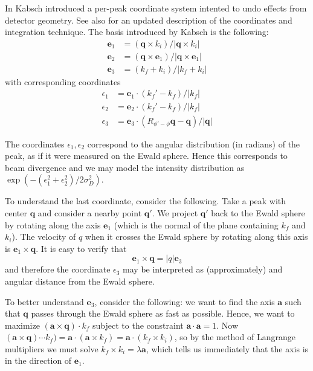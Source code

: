 \documentclass[twocolumn,preprintnumbers,amsmath,amssymb]{revtex4}
\newcommand{\ba}{\mathbf{a}}
\newcommand{\be}{\mathbf{e}}
\newcommand{\bq}{\mathbf{q}}
\begin{document}
In \cite{kabsch-1988} Kabsch introduced a per-peak coordinate system intented to undo effects from detector geometry.
See also \cite{kabsch-2010} for an updated description of the coordinates and integration technique.
The basis introduced by Kabsch is the following:
\begin{align}
  \be_1 &= (\bq \times k_i) / |\bq \times k_i| \\
  \be_2 &= (\bq \times \be_1) / |\bq \times \be_1| \\
  \be_3 &= (k_f + k_i) / |k_f + k_i|
\end{align}
with corresponding coordinates
\begin{align}
  \epsilon_1 &= \be_1 \cdot (k_f'-k_f) / |k_f| \\
  \epsilon_2 &= \be_2 \cdot (k_f'-k_f) / |k_f| \\
  \epsilon_3 &= \be_3 \cdot (R_{\phi'-\phi}\bq-\bq) / |\bq|
\end{align}

The coordinates $\epsilon_1, \epsilon_2$ correspond to the angular distribution (in radians) of the peak, as if it were measured on the Ewald sphere. Hence this corresponds to beam divergence and we may model the intensity distribution as $\exp(-(\epsilon_1^2 + \epsilon_2^2)/2 \sigma_D^2)$.

To understand the last coordinate, consider the following. Take a peak with center $\bq$ and consider a nearby point $\bq'$. We project $\bq'$ back to the Ewald sphere by rotating along the axis $\be_1$ (which is the normal of the plane containing $k_f$ and $k_i$). The velocity of $q$ when it crosses the Ewald sphere by rotating along this axis is $\be_1 \times \bq$. It is easy to verify that
\begin{equation} \be_1 \times \bq = |q| \be_3 \end{equation}
and therefore the coordinate $\epsilon_3$ may be interpreted as (approximately) and angular distance from the Ewald sphere.

To better understand $\be_3$, consider the following: we want to find the axis $\ba$ such that $\bq$ passes through the Ewald sphere as fast as possible. Hence, we want to maximize $(\ba \times \bq) \cdot k_f$ subject to the constraint $\ba \cdot \ba = 1$.
Now $(\ba \times \bq) \cdots k_f) = \ba \cdot (\ba \times k_f) = \ba \cdot (k_f \times k_i)$, so by the method of Langrange multipliers we must solve $k_f \times k_i = \lambda \ba$, which tells us immediately that the axis is in the direction of $\be_1$.
\end{document}
